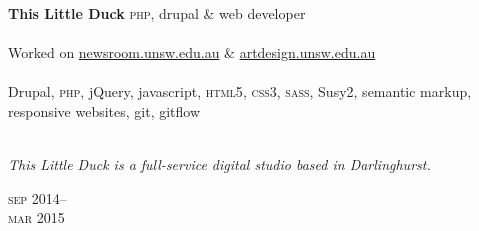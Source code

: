 \begin{minipage}[t]{0.70\textwidth}
\textbf{This Little Duck}\phantom{..} \textsc{php}, drupal \& web developer \\
\\
Worked on \href{https://newsroom.unsw.edu.au/}{newsroom.unsw.edu.au} 
\& \href{https://artdesign.unsw.edu.au/}{artdesign.unsw.edu.au} 
\\
\\
Drupal, \textsc{php}, jQuery, javascript, \textsc{html5}, 
\textsc{css3}, \textsc{sass}, Susy2, semantic markup, responsive websites,
git, gitflow
\\
\\
{\small
\textit{This Little Duck is a full-service digital studio based in Darlinghurst.}
\par}
\end{minipage}
\begin{minipage}[t]{0.30\textwidth}
{
\hfill \textsc{sep} 2014--\\ 
\hspace*{0pt} \hfill \textsc{mar} 2015
\par
}
\end{minipage}
\\




